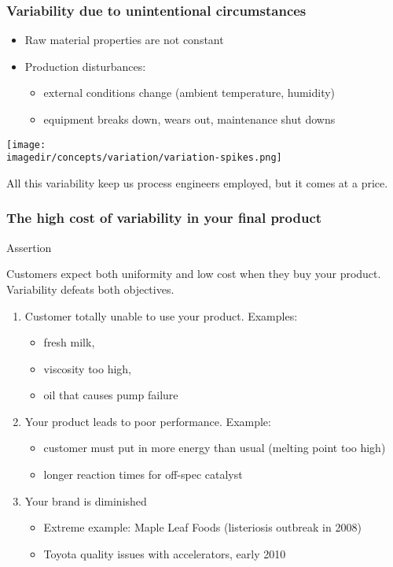 \begin{frame}\frametitle{Variability due to unintentional circumstances}
	\begin{itemize}
		\item	Raw material properties are not constant
		\item	Production disturbances:
		\begin{itemize}
			\item	external conditions change (ambient temperature, humidity)
			\item	equipment breaks down, wears out, maintenance shut downs
		\end{itemize}
	\end{itemize}

	\texttt{[image: \\imagedir/concepts/variation/variation-spikes.png]}

	All this variability keep us process engineers employed, but it comes at a price.
\end{frame}

\begin{frame}\frametitle{The high cost of variability in your final product}
	\begin{block}
		{Assertion}
		\begin{center}
			Customers expect both uniformity and low cost when they buy your product. Variability defeats both objectives.
		\end{center}
	\end{block}
	\begin{enumerate}
		\item	Customer totally unable to use your product. Examples:
		\begin{itemize}
			\item	fresh milk,
			\item	viscosity too high,
			\item	oil that causes pump failure
		\end{itemize}
		\item	Your product leads to poor performance. Example:
		\begin{itemize}
			\item	customer must put in more energy than usual (melting point too high)
			\item	longer reaction times for off-spec catalyst
		\end{itemize}
		\item	Your brand is diminished
		\begin{itemize}
			\item	Extreme example: Maple Leaf Foods (listeriosis outbreak in 2008)
			\item	Toyota quality issues with accelerators, early 2010
		\end{itemize}
	\end{enumerate}
\end{frame}

